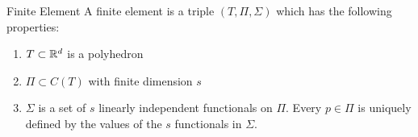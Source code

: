 \begin{defn}{Finite Element}
    A finite element is a triple $(T, \Pi,\Sigma)$ which has the following properties:
    \begin{enumerate}
        \item $T\subset \mathbb{R}^d$ is a polyhedron
        \item $\Pi \subset C(T)$ with finite dimension $s$
        \item $\Sigma$ is a set of $s$ linearly independent functionals on $\Pi$. 
        Every $p\in \Pi$ is uniquely defined by the values of the $s$ functionals in $\Sigma$.
    \end{enumerate}
\end{defn}